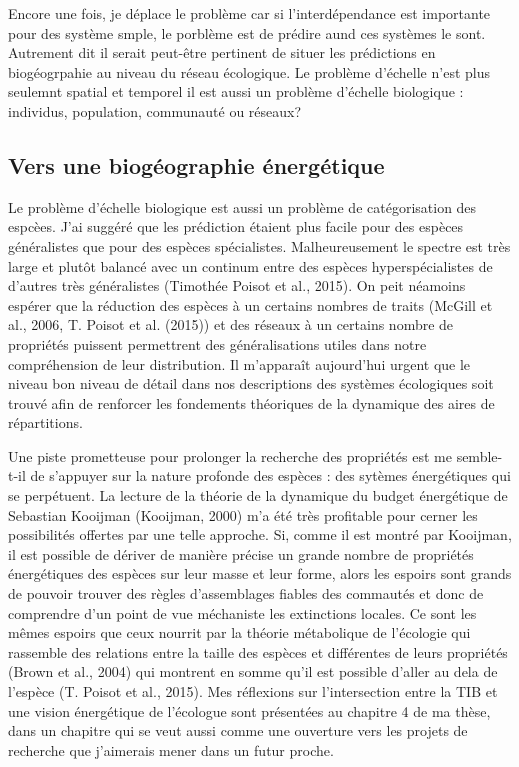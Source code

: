 Encore une fois, je déplace le problème car si l'interdépendance est
importante pour des système smple, le porblème est de prédire aund ces
systèmes le sont. Autrement dit il serait peut-être pertinent de situer
les prédictions en biogéogrpahie au niveau du réseau écologique. Le
problème d'échelle n'est plus seulemnt spatial et temporel il est aussi
un problème d'échelle biologique : individus, population, communauté ou
réseaux?

\subsection*{Vers une biogéographie
énergétique}\label{vers-une-bioguxe9ographie-uxe9nerguxe9tique}

Le problème d'échelle biologique est aussi un problème de catégorisation
des espcèes. J'ai suggéré que les prédiction étaient plus facile pour
des espèces généralistes que pour des espèces spécialistes.
Malheureusement le spectre est très large et plutôt balancé avec un
continum entre des espèces hyperspécialistes de d'autres très
généralistes (Timothée Poisot et al., 2015). On peit néamoins espérer
que la réduction des espèces à un certains nombres de traits (McGill et
al., 2006, T. Poisot et al. (2015)) et des réseaux à un certains nombre
de propriétés puissent permettrent des généralisations utiles dans notre
compréhension de leur distribution. Il m'apparaît aujourd'hui urgent que
le niveau bon niveau de détail dans nos descriptions des systèmes
écologiques soit trouvé afin de renforcer les fondements théoriques de
la dynamique des aires de répartitions.

Une piste prometteuse pour prolonger la recherche des propriétés est me
semble-t-il de s'appuyer sur la nature profonde des espèces : des
sytèmes énergétiques qui se perpétuent. La lecture de la théorie de la
dynamique du budget énergétique de Sebastian Kooijman (Kooijman, 2000)
m'a été très profitable pour cerner les possibilités offertes par une
telle approche. Si, comme il est montré par Kooijman, il est possible de
dériver de manière précise un grande nombre de propriétés énergétiques
des espèces sur leur masse et leur forme, alors les espoirs sont grands
de pouvoir trouver des règles d'assemblages fiables des commautés et
donc de comprendre d'un point de vue méchaniste les extinctions locales.
Ce sont les mêmes espoirs que ceux nourrit par la théorie métabolique de
l'écologie qui rassemble des relations entre la taille des espèces et
différentes de leurs propriétés (Brown et al., 2004) qui montrent en
somme qu'il est possible d'aller au dela de l'espèce (T. Poisot et al.,
2015). Mes réflexions sur l'intersection entre la TIB et une vision
énergétique de l'écologue sont présentées au chapitre 4 de ma thèse,
dans un chapitre qui se veut aussi comme une ouverture vers les projets
de recherche que j'aimerais mener dans un futur proche.

